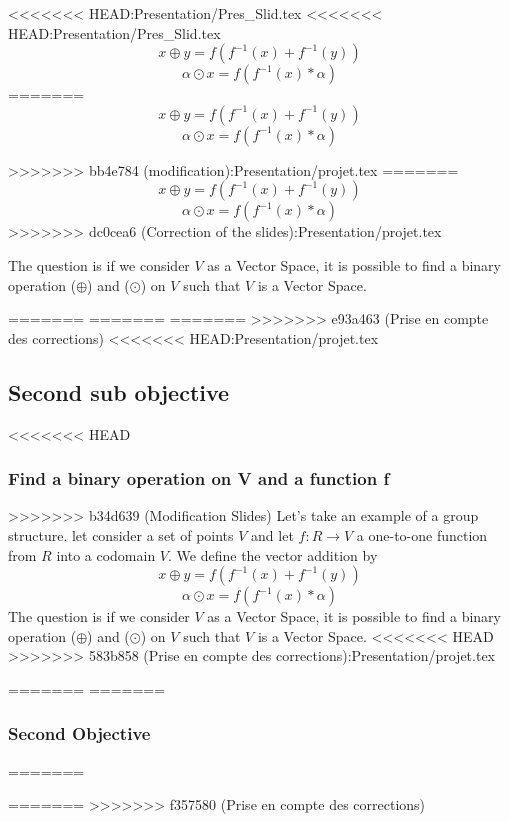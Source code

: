 \documentclass{beamer}
\begin{document}
\begin{frame}
\begin{frame}
\begin{frame}
\begin{frame}
\begin{frame}
\begin{frame}
\begin{frame}
<<<<<<< HEAD:Presentation/Pres_Slid.tex
<<<<<<< HEAD:Presentation/Pres_Slid.tex
    $$ x \oplus y = f(f^{-1}(x) + f^{-1}(y)) $$
    $$ \alpha \odot x = f(f^{-1}(x) * \alpha) $$
=======
     $$ x \oplus y = f(f^{-1}(x) + f^{-1}(y)) $$
     $$ \alpha \odot x = f(f^{-1}(x) * \alpha) $$
		
>>>>>>> bb4e784 (modification):Presentation/projet.tex
=======
    $$ x \oplus y = f(f^{-1}(x) + f^{-1}(y)) $$
    $$ \alpha \odot x = f(f^{-1}(x) * \alpha) $$
>>>>>>> dc0cea6 (Correction of the slides):Presentation/projet.tex

	The question is if we consider $V$ as a Vector Space, it is possible to find a binary operation ($\oplus$) and ($\odot$) on $V$ such that $V$ is a Vector Space.
	
=======
=======
=======
>>>>>>> e93a463 (Prise en compte des corrections)
<<<<<<< HEAD:Presentation/projet.tex
\subsection{Second sub objective}
\begin{frame}
<<<<<<< HEAD
    \frametitle{Find a binary operation on V and a function f }
>>>>>>> b34d639 (Modification Slides)
    Let's take an example of a group structure.
    let consider a set of points  $ V $ and let  $ f: R \rightarrow V $ a one-to-one
    function from $R$ into a codomain $V$. We define the vector addition by
    $$ x \oplus y = f(f^{-1}(x) + f^{-1}(y)) $$
    $$ \alpha \odot x = f(f^{-1}(x) * \alpha) $$
    The question is if we consider $V$ as a Vector Space, it is possible to find a binary operation ($\oplus$) and ($\odot$) on $V$ such that $V$ is a Vector Space.
<<<<<<< HEAD
>>>>>>> 583b858 (Prise en compte des corrections):Presentation/projet.tex
\end{frame}
=======
=======
    \frametitle{Second Objective}
=======



=======
>>>>>>> f357580 (Prise en compte des corrections)

\end{frame}
\end{frame}
\end{frame}
\end{frame}
\end{frame}
\end{frame}
\end{frame}
\end{document}

